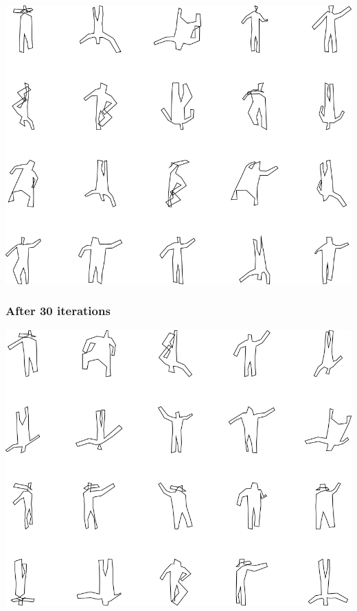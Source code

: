 \includegraphics[width=6in]{output/3.learning/full_tuning/full_tuning_iter20_.png}
\subsubsection{After 30 iterations}

\includegraphics[width=6in]{output/3.learning/full_tuning/full_tuning_iter30_.png}
